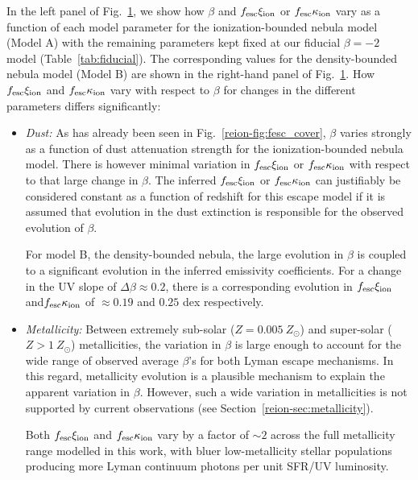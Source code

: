 \begin{figure}
  \label{reion-fig:xi_evol}
\end{figure}

In the left panel of Fig.~\ref{reion-fig:xi_evol}, we show how $\beta$ and $f_{\rm{esc}}\xi_{\rm{ion}}$ or $f_{\rm{esc}}\kappa_{\rm{ion}}$ vary as a function of each model parameter for the ionization-bounded nebula model (Model A) with the remaining parameters kept fixed at our fiducial $\beta = -2$ model (Table~\ref{tab:fiducial}). The corresponding values for the density-bounded nebula model (Model B) are shown in the right-hand panel of Fig.~\ref{reion-fig:xi_evol}. How $f_{\rm{esc}}\xi_{\rm{ion}}$ and $f_{\rm{esc}}\kappa_{\rm{ion}}$ vary with respect to $\beta$ for changes in the different parameters differs significantly:

\begin{itemize}
    \item \emph{Dust:} As has already been seen in Fig.~\ref{reion-fig:fesc_cover}, $\beta$ varies strongly as a function of dust attenuation strength for the ionization-bounded nebula model. There is however minimal variation in $f_{\rm{esc}}\xi_{\rm{ion}}$ or $f_{\rm{esc}}\kappa_{\rm{ion}}$ with respect to that large change in $\beta$. The inferred $f_{\rm{esc}}\xi_{\rm{ion}}$ or $f_{\rm{esc}}\kappa_{\rm{ion}}$ can justifiably be considered constant as a function of redshift for this escape model if it is assumed that evolution in the dust extinction is responsible for the observed evolution of $\beta$.
    
    For model B, the density-bounded nebula, the large evolution in $\beta$ is coupled to a significant evolution in the inferred emissivity coefficients. For a change in the UV slope of $\Delta\beta \approx 0.2$, there is a corresponding evolution in $f_{\rm{esc}}\xi_{\rm{ion}}$ and$f_{\rm{esc}}\kappa_{\rm{ion}}$ of $\approx 0.19$ and $0.25$ dex respectively.
        
    \item \emph{Metallicity:} Between extremely sub-solar ($Z=0.005~Z_{\odot}$) and super-solar ($Z>1~Z_{\odot}$) metallicities, the variation in $\beta$ is large enough to account for the wide range of observed average $\beta$'s for both Lyman escape mechanisms. In this regard, metallicity evolution is a plausible mechanism to explain the apparent variation in $\beta$. However, such a wide variation in metallicities is not supported by current observations (see Section~\ref{reion-sec:metallicity}).
    
    Both $f_{\rm{esc}}\xi_{\rm{ion}}$ and $f_{\rm{esc}}\kappa_{\rm{ion}}$ vary by a factor of $\sim2$ across the full metallicity range modelled in this work, with bluer low-metallicity stellar populations producing more Lyman continuum photons per unit SFR/UV luminosity.
    

\end{itemize}

